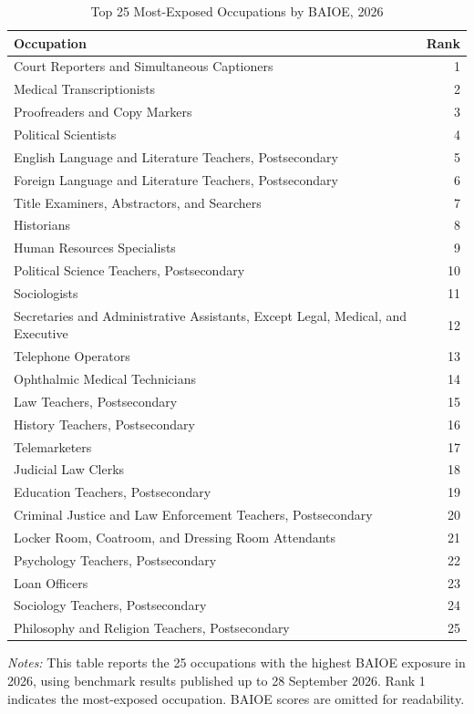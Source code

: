 \begin{table}[htbp]\centering
\caption{Top 25 Most-Exposed Occupations by BAIOE, 2026}\label{tab:table_top25_2026}
\begin{tabular}{lr}\toprule
Occupation & Rank \\ \midrule
Court Reporters and Simultaneous Captioners & 1 \\
Medical Transcriptionists & 2 \\
Proofreaders and Copy Markers & 3 \\
Political Scientists & 4 \\
English Language and Literature Teachers, Postsecondary & 5 \\
Foreign Language and Literature Teachers, Postsecondary & 6 \\
Title Examiners, Abstractors, and Searchers & 7 \\
Historians & 8 \\
Human Resources Specialists & 9 \\
Political Science Teachers, Postsecondary & 10 \\
Sociologists & 11 \\
Secretaries and Administrative Assistants, Except Legal, Medical, and Executive & 12 \\
Telephone Operators & 13 \\
Ophthalmic Medical Technicians & 14 \\
Law Teachers, Postsecondary & 15 \\
History Teachers, Postsecondary & 16 \\
Telemarketers & 17 \\
Judicial Law Clerks & 18 \\
Education Teachers, Postsecondary & 19 \\
Criminal Justice and Law Enforcement Teachers, Postsecondary & 20 \\
Locker Room, Coatroom, and Dressing Room Attendants & 21 \\
Psychology Teachers, Postsecondary & 22 \\
Loan Officers & 23 \\
Sociology Teachers, Postsecondary & 24 \\
Philosophy and Religion Teachers, Postsecondary & 25 \\
\bottomrule\end{tabular}
\begin{minipage}{0.95\linewidth}\footnotesize \textit{Notes:} This table reports the 25 occupations with the highest BAIOE exposure in 2026, using benchmark results published up to 28 September 2026. Rank 1 indicates the most-exposed occupation. BAIOE scores are omitted for readability.\end{minipage}
\end{table}
